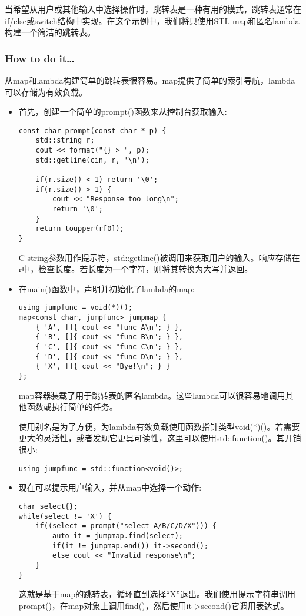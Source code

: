 
当希望从用户或其他输入中选择操作时，跳转表是一种有用的模式，跳转表通常在if/else或switch结构中实现。在这个示例中，我们将只使用STL map和匿名lambda构建一个简洁的跳转表。


\subsubsection{How to do it…}

从map和lambda构建简单的跳转表很容易。map提供了简单的索引导航，lambda可以存储为有效负载。

\begin{itemize}
\item 
首先，创建一个简单的prompt()函数来从控制台获取输入:

\begin{lstlisting}[style=styleCXX]
const char prompt(const char * p) {
	std::string r;
	cout << format("{} > ", p);
	std::getline(cin, r, '\n');
	
	if(r.size() < 1) return '\0';
	if(r.size() > 1) {
		cout << "Response too long\n";
		return '\0';
	}
	return toupper(r[0]);
}
\end{lstlisting}

C-string参数用作提示符，std::getline()被调用来获取用户的输入。响应存储在r中，检查长度。若长度为一个字符，则将其转换为大写并返回。

\item 
在main()函数中，声明并初始化了lambda的map:

\begin{lstlisting}[style=styleCXX]
using jumpfunc = void(*)();
map<const char, jumpfunc> jumpmap {
	{ 'A', []{ cout << "func A\n"; } },
	{ 'B', []{ cout << "func B\n"; } },
	{ 'C', []{ cout << "func C\n"; } },
	{ 'D', []{ cout << "func D\n"; } },
	{ 'X', []{ cout << "Bye!\n"; } }
};
\end{lstlisting}

map容器装载了用于跳转表的匿名lambda。这些lambda可以很容易地调用其他函数或执行简单的任务。

使用别名是为了方便，为lambda有效负载使用函数指针类型void(*)()。若需要更大的灵活性，或者发现它更具可读性，这里可以使用std::function()。其开销很小:

\begin{lstlisting}[style=styleCXX]
using jumpfunc = std::function<void()>;
\end{lstlisting}

\item 
现在可以提示用户输入，并从map中选择一个动作:

\begin{lstlisting}[style=styleCXX]
char select{};
while(select != 'X') {
	if((select = prompt("select A/B/C/D/X"))) {
		auto it = jumpmap.find(select);
		if(it != jumpmap.end()) it->second();
		else cout << "Invalid response\n";
	}
}
\end{lstlisting}

这就是基于map的跳转表，循环直到选择“X”退出。我们使用提示字符串调用prompt()，在map对象上调用find()，然后使用it->second()它调用表达式。
\end{itemize}


